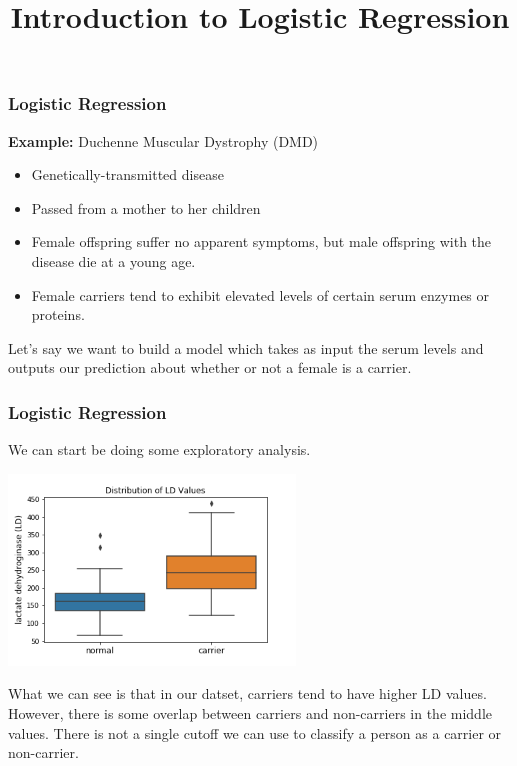 \documentclass[11pt, table]{beamer}
\begin{document}
	\title{Introduction to Logistic Regression}
	\begin{frame}[plain]
	\maketitle
\end{frame}

\begin{frame}
\frametitle{Logistic Regression}
\textbf{Example:} Duchenne Muscular Dystrophy (DMD)
\begin{itemize}
	\item Genetically-transmitted disease
	\item Passed from a mother to her children
	\item Female offspring suffer no apparent symptoms, but male offspring with the disease die at a young age.
	\item Female carriers tend to exhibit elevated levels of certain serum enzymes or proteins.
\end{itemize}
\vspace{0.1in}

Let's say we want to build a model which takes as input the serum levels and outputs our prediction about whether or not a female is a carrier.
\end{frame}

\begin{frame}
\frametitle{Logistic Regression}

We can start be doing some exploratory analysis.

\begin{center}
	\includegraphics[width = 3in]{images/Dystrophy/LD_box.png}
\end{center}

What we can see is that in our datset, carriers tend to have higher LD values. However, there is some overlap between carriers and non-carriers in the middle values. There is not a single cutoff we can use to classify a person as a carrier or non-carrier.
\end{frame}
\end{document}
